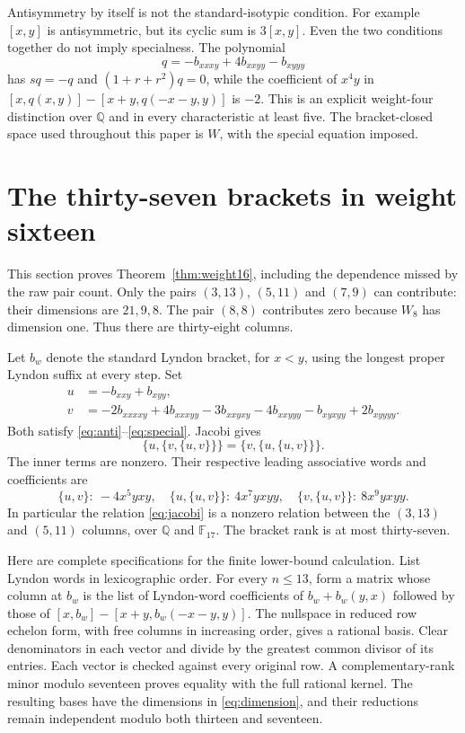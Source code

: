 \documentclass[11pt]{article}
\newcommand{\F}{\mathbb F}
\newcommand{\Q}{\mathbb Q}
\theoremstyle{definition}
\theoremstyle{remark}
\begin{document}
Antisymmetry by itself is not the standard-isotypic condition.  For
example $[x,y]$ is antisymmetric, but its cyclic sum is $3[x,y]$.
Even the two conditions together do not imply specialness.  The
polynomial
\[
 q=-b_{xxxy}+4b_{xxyy}-b_{xyyy}
\]
has $sq=-q$ and $(1+r+r^2)q=0$, while the coefficient of $x^4y$ in
$[x,q(x,y)]-[x+y,q(-x-y,y)]$ is $-2$.  This is an explicit
weight-four distinction over $\Q$ and in every characteristic at least
five.  The bracket-closed space used throughout this paper is $W$,
with the special equation imposed.

\section{The thirty-seven brackets in weight sixteen}\label{sec:brackets}
This section proves Theorem~\ref{thm:weight16}, including the dependence
missed by the raw pair count.
Only the pairs $(3,13)$, $(5,11)$ and $(7,9)$ can contribute: their
dimensions are $21,9,8$.  The pair $(8,8)$ contributes zero because
$W_8$ has dimension one.  Thus there are thirty-eight columns.

Let $b_w$ denote the standard Lyndon bracket, for $x<y$, using the longest
proper Lyndon suffix at every step.  Set
\begin{align*}
 u&=-b_{xxy}+b_{xyy},\\
 v&=-2b_{xxxxy}+4b_{xxxyy}-3b_{xxyxy}
       -4b_{xxyyy}-b_{xyxyy}+2b_{xyyyy}.
\end{align*}
Both satisfy \eqref{eq:anti}--\eqref{eq:special}.  Jacobi gives
\begin{equation}
 \{u,\{v,\{u,v\}\}\}=\{v,\{u,\{u,v\}\}\}.
 \label{eq:jacobi}
\end{equation}
The inner terms are nonzero.  Their respective leading associative words
and coefficients are
\[
 \{u,v\}:\ -4x^5yxy,\quad
 \{u,\{u,v\}\}:\ 4x^7yxyy,\quad
 \{v,\{u,v\}\}:\ 8x^9yxyy.
\]
In particular the relation \eqref{eq:jacobi} is a nonzero relation
between the $(3,13)$ and $(5,11)$ columns, over $\Q$ and $\F_{17}$.
The bracket rank is at most thirty-seven.

Here are complete specifications for the finite lower-bound calculation.
List Lyndon words in lexicographic order.  For every $n\leq13$, form a
matrix whose column at $b_w$ is the list of Lyndon-word coefficients of
$b_w+b_w(y,x)$ followed by those of
$[x,b_w]-[x+y,b_w(-x-y,y)]$.
The nullspace in reduced row echelon form, with free columns in increasing
order, gives a rational basis.  Clear denominators in each vector and
divide by the greatest common divisor of its entries.
Each vector is checked against every original row.  A complementary-rank
minor modulo seventeen proves equality with the full rational kernel.
The resulting bases have the dimensions in \eqref{eq:dimension}, and
their reductions remain independent modulo both thirteen and seventeen.
\end{document}
